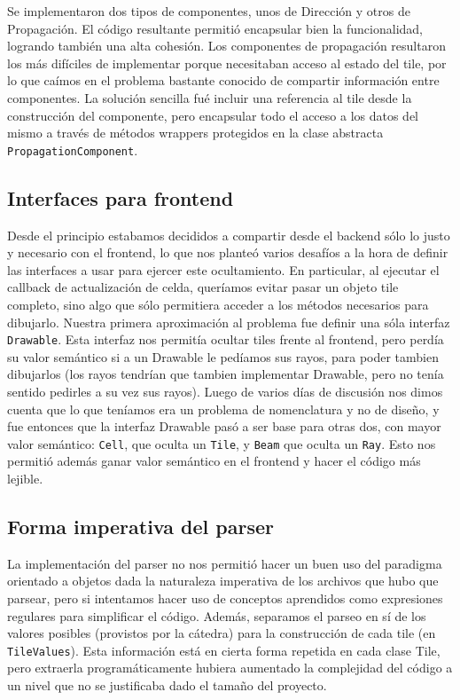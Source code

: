 \documentclass[a4paper, 11pt]{article}
\begin{document}
	Se implementaron dos tipos de componentes, unos de Dirección y otros de Propagación. El código resultante permitió encapsular bien la funcionalidad, logrando también una alta cohesión. Los componentes de propagación resultaron los más difíciles de implementar porque necesitaban acceso al estado del tile, por lo que caímos en el problema bastante conocido de compartir información entre componentes. La solución sencilla fué incluir una referencia al tile desde la construcción del componente, pero encapsular todo el acceso a los datos del mismo a través de métodos wrappers protegidos en la clase abstracta \texttt{PropagationComponent}.

	\subsection{Interfaces para frontend}
	Desde el principio estabamos decididos a compartir desde el backend sólo lo justo y necesario con el frontend, lo que nos planteó varios desafíos a la hora de definir las interfaces a usar para ejercer este ocultamiento. En particular, al ejecutar el callback de actualización de celda, queríamos evitar pasar un objeto tile completo, sino algo que sólo permitiera acceder a los métodos necesarios para dibujarlo. Nuestra primera aproximación al problema fue definir una sóla interfaz \texttt{Drawable}. Esta interfaz nos permitía ocultar tiles frente al frontend, pero perdía su valor semántico si a un Drawable le pedíamos sus rayos, para poder tambien dibujarlos (los rayos tendrían que tambien implementar Drawable, pero no tenía sentido pedirles a su vez sus rayos). Luego de varios días de discusión nos dimos cuenta que lo que teníamos era un problema de nomenclatura y no de diseño, y fue entonces que  la interfaz Drawable pasó a ser base para otras dos, con mayor valor semántico: \texttt{Cell}, que oculta un \texttt{Tile}, y \texttt{Beam} que oculta un \texttt{Ray}. Esto nos permitió además ganar valor semántico en el frontend y hacer el código más lejible.

	\subsection{Forma imperativa del parser}
	La implementación del parser no nos permitió hacer un buen uso del paradigma orientado a objetos dada la naturaleza imperativa de los archivos que hubo que parsear, pero si intentamos hacer uso de conceptos aprendidos como expresiones regulares para simplificar el código. Además, separamos el parseo en sí de los valores posibles (provistos por la cátedra) para la construcción de cada tile (en \texttt{TileValues}). Esta información está en cierta forma repetida en cada clase Tile, pero extraerla programáticamente hubiera aumentado la complejidad del código a un nivel que no se justificaba dado el tamaño del proyecto.
\end{document}
